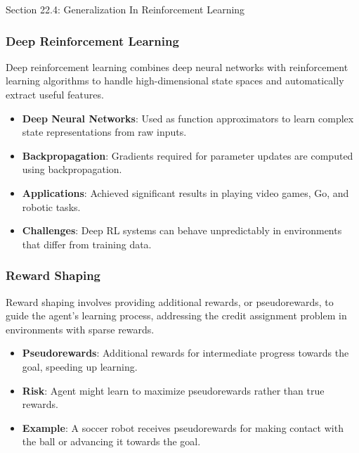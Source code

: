 \begin{notes}{Section 22.4: Generalization In Reinforcement Learning}
    \subsubsection*{Deep Reinforcement Learning}
    
    Deep reinforcement learning combines deep neural networks with reinforcement learning algorithms to handle high-dimensional state spaces and automatically extract useful features.
    
    \begin{highlight}
    
        \begin{itemize}
            \item \textbf{Deep Neural Networks}: Used as function approximators to learn complex state representations from raw inputs.
            \item \textbf{Backpropagation}: Gradients required for parameter updates are computed using backpropagation.
            \item \textbf{Applications}: Achieved significant results in playing video games, Go, and robotic tasks.
            \item \textbf{Challenges}: Deep RL systems can behave unpredictably in environments that differ from training data.
        \end{itemize}
    
    \end{highlight}
    
    \subsubsection*{Reward Shaping}
    
    Reward shaping involves providing additional rewards, or pseudorewards, to guide the agent's learning process, addressing the credit assignment problem in environments with sparse rewards.
    
    \begin{highlight}
    
        \begin{itemize}
            \item \textbf{Pseudorewards}: Additional rewards for intermediate progress towards the goal, speeding up learning.
            \item \textbf{Risk}: Agent might learn to maximize pseudorewards rather than true rewards.
            \item \textbf{Example}: A soccer robot receives pseudorewards for making contact with the ball or advancing it towards the goal.
        \end{itemize}
    

\end{highlight}
\end{notes}
